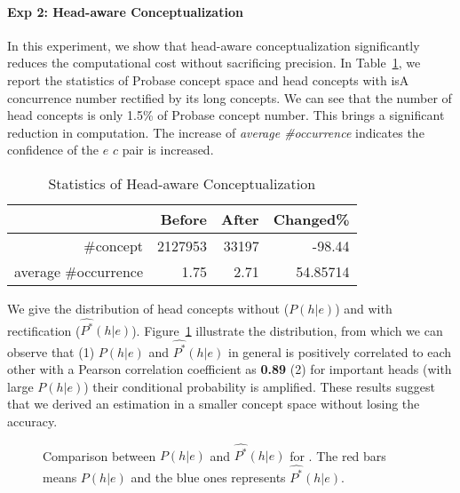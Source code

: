 \paragraph*{Exp 2: Head-aware Conceptualization}
In this experiment, we show that head-aware conceptualization significantly reduces the computational cost without sacrificing precision. 
In Table~\ref{tab:nhc}, we report the statistics of Probase concept space and head concepts with isA concurrence number rectified by its long concepts. 
We can see that the number of head concepts is only 1.5\% of Probase concept number. This brings a significant reduction in computation. 
The increase of \emph{average \#occurrence} indicates the confidence of the $e$ \isa $c$ pair is increased.


\begin{table}[htbp]
\vspace{-4mm}
  \centering
  \caption{Statistics of Head-aware Conceptualization}
  \small
    \begin{tabular}{rrrr}
    \toprule
          & Before & After & Changed\% \\
    \midrule
    \#concept & 2127953 & 33197 & -98.44 \\
    average \#occurrence & 1.75  & 2.71  & 54.85714 \\
    \bottomrule
    \end{tabular}%
  \label{tab:nhc}%
\end{table}%


We give the distribution of head concepts without ($P(h|e)$) and with rectification ($\hat{P^*}(h|e)$).  Figure~\ref{fig:hac} illustrate the distribution, from which we can observe that (1) $P(h|e)$ and $\hat{P^*}(h|e)$ in general is positively correlated to each other with a Pearson correlation coefficient as {\bf 0.89} (2) for important heads (with large $P(h|e)$) their conditional probability is amplified. These results suggest that we derived an estimation in a smaller concept space without losing the accuracy.


\begin{figure}[!tb]
\centering
\small
{}
\vspace{-8mm}
\caption{Comparison between $P(h|e)$ and $\hat{P^*}(h|e)$ for . \small The red bars means $P(h|e)$ and the blue ones represents $\hat{P^*}(h|e)$. }
\label{fig:hac}
\vspace{-6mm}
%
\vspace{-6mm}
\end{figure}



